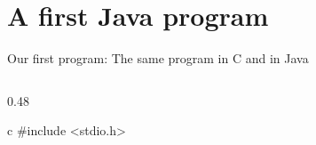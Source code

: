 \documentclass[\deckoptions]{beamer}
\begin{document}
\section{A first Java program}

\begin{frame}[fragile]{Our first program: }{The same program in C and in Java}
  \begin{columns}[T, onlytextwidth]
    \begin{column}{0.48\textwidth}
\begin{codeblock}[steps={|none|3,5-6|1,4|}, steps from=2, compact]{c}
#include <stdio.h>


\end{codeblock}
\end{column}
\end{columns}
\end{frame}
\end{document}
